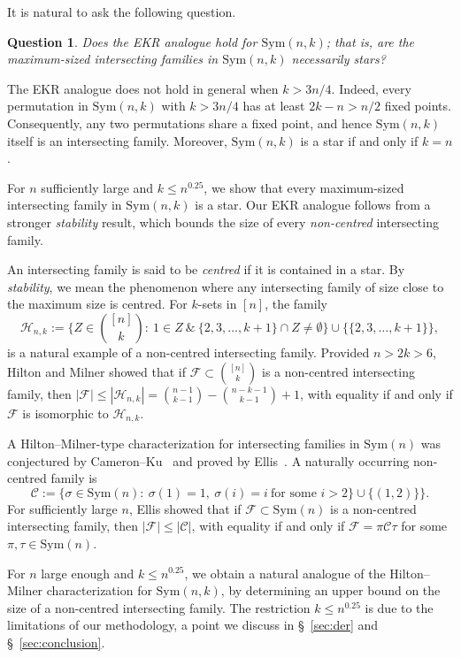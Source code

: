 \documentclass{amsart}
\newtheorem{ques}[thm]{Question}
\newcommand{\mcal}{\mathcal}
\newcommand{\sym}{\mathrm{Sym}}
\begin{document}
It is natural to ask the following question.
\begin{ques}\label{ques:ekr}
Does the EKR analogue hold for $\sym(n,k)$; that is, are the\\ 
maximum-sized intersecting families in $\sym(n,k)$ necessarily stars?
\end{ques}

The EKR analogue does not hold in general when $k>3n/4$. Indeed, every permutation in $\sym(n,k)$ with $k>3n/4$ has at least $2k-n>n/2$ fixed points. Consequently, any two permutations share a fixed point, and hence $\sym(n,k)$ itself is an intersecting family. Moreover, $\sym(n,k)$ is a star if and only if $k=n$.

For $n$ sufficiently large and $k\leq n^{0.25}$, we show that every maximum-sized intersecting family in $\sym(n,k)$ is a star. Our EKR analogue follows from a stronger {\it stability} result, which bounds the size of every {\it non-centred} intersecting family. 

An intersecting family is said to be {\it centred} if it is contained in a star. By {\it stability}, we mean the phenomenon where any intersecting family of size close to the maximum size is centred. For $k$-sets in $[n]$, the family 
\[\mcal{H}_{n,k}:=\{Z \in \binom{[n]}{k}\colon\ 1\in Z\ \&\ \{2,3,\ldots, k+1\}\cap Z\neq \emptyset \} \cup \{\{2,3,\ldots, k+1\}\},\] is a natural example of a non-centred intersecting family. Provided $n>2k>6$, Hilton and Milner \cite{HM67} showed that if $\mcal{F}\subset \binom{[n]}{k}$ is a non-centred intersecting family, then $|\mcal{F}| \leq |\mcal{H}_{n,k}|=\binom{n-1}{k-1}-\binom{n-k-1}{k-1}+1$, with equality if and only if $\mcal{F}$ is isomorphic to $\mcal{H}_{n,k}$.

A Hilton--Milner-type characterization for intersecting families in $\sym(n)$ was conjectured by Cameron--Ku~\cite{DezaFrankl77} and proved by Ellis~\cite{Ellisstability}. A naturally occurring non-centred family is
\[\mcal{C}:=\{\sigma\in \sym(n)\colon\ \sigma(1)=1,\ \sigma(i)=i\ \text{for some $i>2$}\} \cup \{(1,2)\}\}.\] For sufficiently large $n$, Ellis \cite{Ellisstability} showed that if $\mcal{F}\subset \sym(n)$ is a non-centred intersecting family, then $|\mcal{F}| \leq|\mcal{C}|$, with equality if and only if $\mcal{F}=\pi\mcal{C}\tau$ for some $\pi,\tau\in\sym(n)$. 

For $n$ large enough and $k\leq n^{0.25}$, we obtain a natural analogue of the Hilton--Milner characterization for $\sym(n,k)$, by determining an upper bound on the size of a non-centred intersecting family. The restriction $k\leq n^{0.25}$ is due to the limitations of our methodology, a point we discuss in \S~\ref{sec:der} and \S~\ref{sec:conclusion}.
\end{document}
